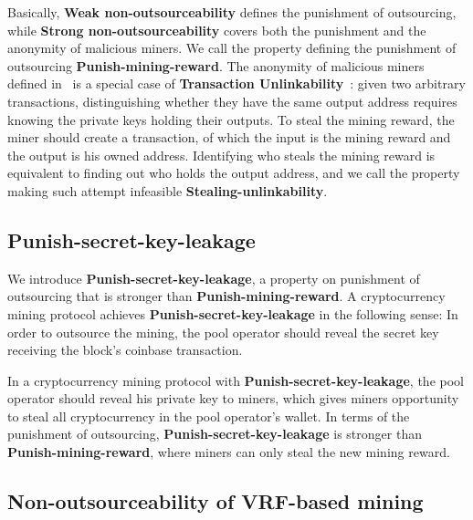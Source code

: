 Basically, \textbf{Weak non-outsourceability} defines the punishment of outsourcing, while \textbf{Strong non-outsourceability} covers both the punishment and the anonymity of malicious miners.
We call the property defining the punishment of outsourcing \textbf{Punish-mining-reward}.
The anonymity of malicious miners defined in~\cite{miller2015nonoutsourceable} is a special case of \textbf{Transaction Unlinkability}~\cite{van2013cryptonote}: given two arbitrary transactions, distinguishing whether they have the same output address requires knowing the private keys holding their outputs.
To steal the mining reward, the miner should create a transaction, of which the input is the mining reward and the output is his owned address.
Identifying who steals the mining reward is equivalent to finding out who holds the output address, and we call the property making such attempt infeasible \textbf{Stealing-unlinkability}.


\subsection{Punish-secret-key-leakage}

We introduce \textbf{Punish-secret-key-leakage}, a property on punishment of outsourcing that is stronger than \textbf{Punish-mining-reward}.
A cryptocurrency mining protocol achieves \textbf{Punish-secret-key-leakage} in the following sense: In order to outsource the mining, the pool operator should reveal the secret key receiving the block's coinbase transaction.

In a cryptocurrency mining protocol with \textbf{Punish-secret-key-leakage}, the pool operator should reveal his private key to miners, which gives miners opportunity to steal all cryptocurrency in the pool operator's wallet.
In terms of the punishment of outsourcing, \textbf{Punish-secret-key-leakage} is stronger than \textbf{Punish-mining-reward}, where miners can only steal the new mining reward.






\subsection{Non-outsourceability of VRF-based mining}

